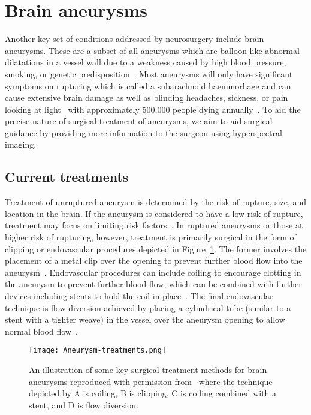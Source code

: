 \section{Brain aneurysms}\label{sec:aneurysms}
Another key set of conditions addressed by neurosurgery include brain aneurysms. These are a subset of all aneurysms which are balloon-like abnormal dilatations in a vessel wall due to a weakness caused by high blood pressure, smoking, or genetic predisposition~\citep{NationalHealthService2022}. Most aneurysms will only have significant symptoms on rupturing which is called a subarachnoid haemmorhage and can cause extensive brain damage as well as blinding headaches, sickness, or pain looking at light~\citep{NationalHealthService2022} with approximately 500,000 people dying annually~\citep{Toth2018}. To aid the precise nature of surgical treatment of aneurysms, we aim to aid surgical guidance by providing more information to the surgeon using hyperspectral imaging. 

\subsection{Current treatments}\label{sec:introaneurysmtreatments}
Treatment of unruptured aneurysm is determined by the risk of rupture, size, and location in the brain. If the aneurysm is considered to have a low risk of rupture, treatment may focus on limiting risk factors~\citep{NationalHealthService2022}. In ruptured aneurysms or those at higher risk of rupturing, however, treatment is primarily surgical in the form of clipping or endovascular procedures depicted in Figure~\ref{fig:aneurysmtreatment}. The former involves the placement of a metal clip over the opening to prevent further blood flow into the aneurysm~\citep{TheBrainFoundation2023}. Endovascular procedures can include coiling to encourage clotting in the aneurysm to prevent further blood flow, which can be combined with further devices including stents to hold the coil in place~\citep{TheBrainFoundation2023}. The final endovascular technique is flow diversion achieved by placing a cylindrical tube (similar to a stent with a tighter weave) in the vessel over the aneurysm opening to allow normal blood flow~\citep{TheBrainFoundation2023}. 
\begin{figure}[h]
    \centering
    \texttt{[image: Aneurysm-treatments.png]}
    \caption{An illustration of some key surgical treatment methods for brain aneurysms reproduced with permission from~\citep{Perrone2015} where the technique depicted by A is coiling, B is clipping, C is coiling combined with a stent, and D is flow diversion.}
    \label{fig:aneurysmtreatment}
\end{figure}

